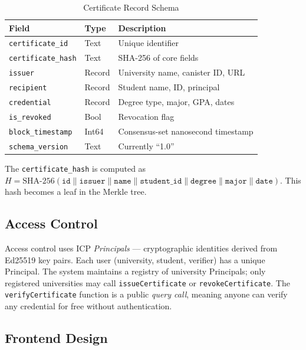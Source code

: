 \documentclass[conference]{IEEEtran}
\begin{document}
\begin{table}[h]
\caption{Certificate Record Schema}
\label{tab:schema}
\centering\small\renewcommand{\arraystretch}{1.1}
\begin{tabular}{@{}lll@{}}
\toprule
\textbf{Field} & \textbf{Type} & \textbf{Description} \\
\midrule
\texttt{certificate\_id}    & Text   & Unique identifier \\
\texttt{certificate\_hash}  & Text   & SHA-256 of core fields \\
\texttt{issuer}             & Record & University name, canister ID, URL \\
\texttt{recipient}          & Record & Student name, ID, principal \\
\texttt{credential}         & Record & Degree type, major, GPA, dates \\
\texttt{is\_revoked}        & Bool   & Revocation flag \\
\texttt{block\_timestamp}   & Int64  & Consensus-set nanosecond timestamp \\
\texttt{schema\_version}    & Text   & Currently ``1.0'' \\
\bottomrule
\end{tabular}
\end{table}

The \texttt{certificate\_hash} is computed as $H = \text{SHA-256}(\texttt{id} \| \texttt{issuer} \| \texttt{name} \| \texttt{student\_id} \| \texttt{degree} \| \texttt{major} \| \texttt{date})$. This hash becomes a leaf in the Merkle tree.

\subsection{Access Control}

Access control uses ICP \emph{Principals} — cryptographic identities derived from Ed25519 key pairs. Each user (university, student, verifier) has a unique Principal. The system maintains a registry of university Principals; only registered universities may call \texttt{issueCertificate} or \texttt{revokeCertificate}. The \texttt{verifyCertificate} function is a public \emph{query call}, meaning anyone can verify any credential for free without authentication.

\subsection{Frontend Design}
\end{document}
